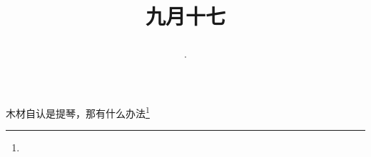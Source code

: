 \title{\date[d=19,m=10,y=2024][year:cn-y,年,month:cn,day:cn,日,·,weekday]·九月十七 }
木材自认是提琴，那有什么办法\footnote{ }

